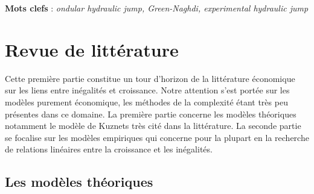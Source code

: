 \documentclass[11pt,a4paper]{article}
\begin{document}
\vspace{0.5cm}

\parbox{15cm}{
\textbf{Mots clefs} : \it ondular hydraulic jump, Green-Naghdi, experimental hydraulic jump
} %

\tableofcontents

\section{Revue de littérature}

Cette première partie constitue un tour d'horizon de la littérature économique sur les liens entre inégalités et croissance. Notre attention s'est portée sur les modèles purement économique, les méthodes de la complexité étant très peu présentes dans ce domaine. 
La première partie concerne les modèles théoriques notamment le modèle de Kuznets très cité dans la littérature. La seconde partie se focalise sur les modèles empiriques qui concerne pour la plupart en la recherche de relations linéaires entre la croissance et les inégalités. 

\subsection{Les modèles théoriques}
\end{document}
